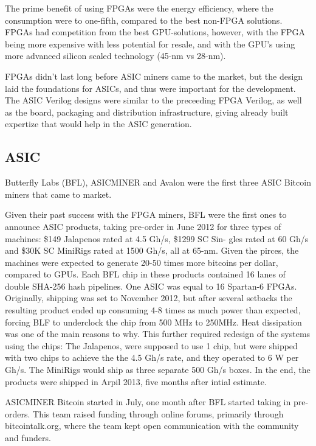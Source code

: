 The prime benefit of using FPGAs were the energy efficiency, where the consumption were to one-fifth, compared to the best non-FPGA solutions.
FPGAs had competition from the best GPU-solutions, however, with the FPGA being more expensive with less potential for resale, and with the GPU's using more advanced silicon scaled technology (45-nm vs 28-nm).

FPGAs didn't last long before ASIC miners came to the market, but the design laid the foundations for ASICs, and thus were important for the development. 
The ASIC Verilog designs were similar to the preceeding FPGA Verilog, as well as the board, packaging and distribution infrastructure, giving already built expertize that would help in the ASIC generation.
\cite{bespoke-silicon}

\subsection{ASIC}

Butterfly Labs (BFL), ASICMINER and Avalon were the first three ASIC Bitcoin miners that came to market.

Given their past success with the FPGA miners, BFL were the first ones to announce ASIC products, taking pre-order in June 2012 for three types of machines:
\$149 Jalapenos rated at 4.5 Gh/s, \$1299 SC Sin- gles rated at 60 Gh/s and \$30K SC MiniRigs rated at 1500 Gh/s, all at 65-nm.
Given the pirces, the machines were expected to generate 20-50 times more bitcoins per dollar, compared to GPUs.
Each BFL chip in these products contained 16 lanes of double SHA-256 hash pipelines.
One ASIC was equal to 16 Spartan-6 FPGAs. 
Originally, shipping was set to November 2012, but after several setbacks the resulting product ended up consuming 4-8 times as much power than expected, forcing BLF to underclock the chip from 500 MHz to 250MHz.
Heat dissipation was one of the main reasons to why.
This further required redesign of the systems using the chips:
The Jalapenos, were supposed to use 1 chip, but were shipped with two chips to achieve the the 4.5 Gh/s rate, and they operated to 6 W per Gh/s. 
The MiniRigs would ship as three separate 500 Gh/s boxes.
In the end, the products were shipped in Arpil 2013, five months after intial estimate.

ASICMINER Bitcoin started in July, one month after BFL started taking in pre-orders.
This team raised funding through online forums, primarily through bitcointalk.org, where the team kept open communication with the community and funders.

